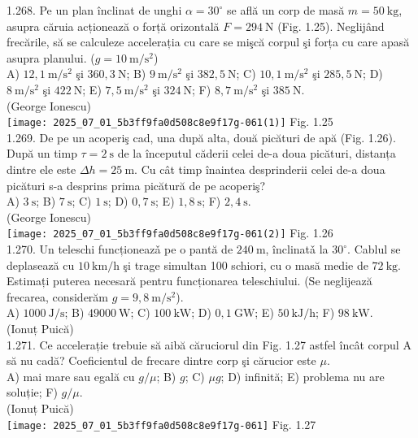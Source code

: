 {1.268. Pe un plan înclinat de unghi $\alpha=30^{\circ}$ se află un corp de masă $m=50 \mathrm{~kg}$, asupra căruia acționează o forță orizontală $F=294 \mathrm{~N}$ (Fig. 1.25). Neglijând frecările, să se calculeze accelerația cu care se mişcă corpul şi forța cu care apasă asupra planului. ($g=10 \mathrm{~m} / \mathrm{s}^{2}$)\\ A) $12,1 \mathrm{~m} / \mathrm{s}^{2}$ şi $360,3 \mathrm{~N}$; B) $9 \mathrm{~m} / \mathrm{s}^{2}$ şi $382,5 \mathrm{~N}$; C) $10,1 \mathrm{~m} / \mathrm{s}^{2}$ şi $285,5 \mathrm{~N}$; D) $8 \mathrm{~m} / \mathrm{s}^{2}$ şi $422 \mathrm{~N}$; E) $7,5 \mathrm{~m} / \mathrm{s}^{2}$ şi $324 \mathrm{~N}$; F) $8,7 \mathrm{~m} / \mathrm{s}^{2}$ şi $385 \mathrm{~N}$.\\ (George Ionescu)\\ \texttt{[image: 2025\_07\_01\_5b3ff9fa0d508c8e9f17g-061(1)]} Fig. 1.25\\

1.269. De pe un acoperiş cad, una după alta, două picături de apă (Fig. 1.26). După un timp $\tau=2 \mathrm{~s}$ de la începutul căderii celei de-a doua picături, distanța dintre ele este $\Delta h=25 \mathrm{~m}$. Cu cât timp înaintea desprinderii celei de-a doua picături s-a desprins prima picătură de pe acoperiş?\\ A) $3 \mathrm{~s}$; B) $7 \mathrm{~s}$; C) $1 \mathrm{~s}$; D) $0,7 \mathrm{~s}$; E) $1,8 \mathrm{~s}$; F) $2,4 \mathrm{~s}$.\\ (George Ionescu)\\ \texttt{[image: 2025\_07\_01\_5b3ff9fa0d508c8e9f17g-061(2)]} Fig. 1.26\\

1.270. Un teleschi funcționeazǎ pe o pantă de $240 \mathrm{~m}$, înclinatǎ la $30^{\circ}$. Cablul se deplasează cu $10 \mathrm{~km} / \mathrm{h}$ şi trage simultan 100 schiori, cu o masă medie de $72 \mathrm{~kg}$. Estimați puterea necesară pentru funcționarea teleschiului. (Se neglijează frecarea, considerăm $g=9,8 \mathrm{~m} / \mathrm{s}^{2}$).\\ A) $1000 \mathrm{~J} / \mathrm{s}$; B) $49000 \mathrm{~W}$; C) $100 \mathrm{~kW}$; D) $0,1 \mathrm{~GW}$; E) $50 \mathrm{~kJ} / \mathrm{h}$; F) $98 \mathrm{~kW}$.\\ (Ionuț Puică)\\

1.271. Ce accelerație trebuie să aibă căruciorul din Fig. 1.27 astfel încât corpul A să nu cadă? Coeficientul de frecare dintre corp şi cărucior este $\mu$.\\ A) mai mare sau egală cu $g / \mu$; B) $g$; C) $\mu g$; D) infinită; E) problema nu are soluție; F) $g / \mu$.\\ (Ionuț Puică)\\ \texttt{[image: 2025\_07\_01\_5b3ff9fa0d508c8e9f17g-061]} Fig. 1.27\\

}
